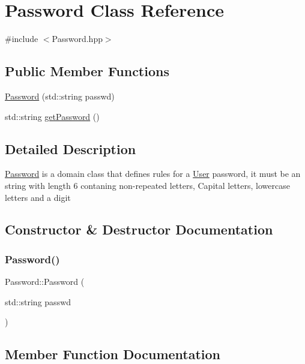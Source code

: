 \hypertarget{class_password}{}\section{Password Class Reference}
\label{class_password}


{\ttfamily \#include $<$Password.\+hpp$>$}

\subsection*{Public Member Functions}
\begin{DoxyCompactItemize}
\item 
\mbox{\hyperlink{class_password_a0396be0fcff4a511c431e44d015dbe08}{Password}} (std\+::string passwd)
\item 
std\+::string \mbox{\hyperlink{class_password_aee8284b06e0c79e83030de2cb4d7fa19}{get\+Password}} ()
\end{DoxyCompactItemize}


\subsection{Detailed Description}
\mbox{\hyperlink{class_password}{Password}} is a domain class that defines rules for a \mbox{\hyperlink{class_user}{User}} password, it must be an string with length 6 contaning non-\/repeated letters, Capital letters, lowercase letters and a digit 

\subsection{Constructor \& Destructor Documentation}
\mbox{\label{class_password_a0396be0fcff4a511c431e44d015dbe08}} 
\subsubsection{\texorpdfstring{Password()}{Password()}}
{\footnotesize\ttfamily Password\+::\+Password (\begin{DoxyParamCaption}\item[{std\+::string}]{passwd }\end{DoxyParamCaption})}



\subsection{Member Function Documentation}
\mbox{\label{class_password_aee8284b06e0c79e83030de2cb4d7fa19}} 
